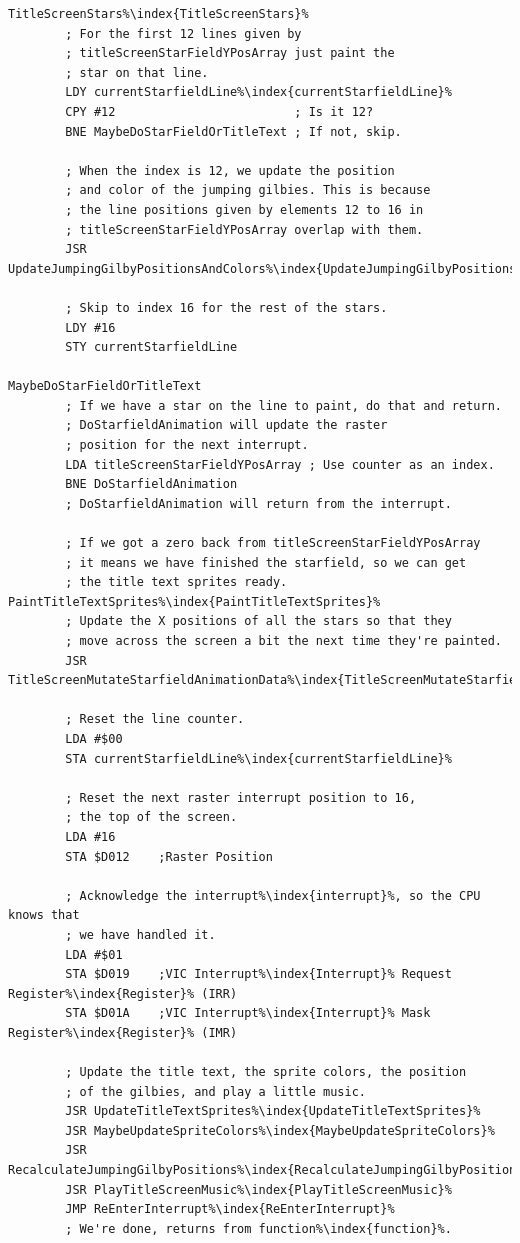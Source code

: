 \begin{lstlisting}[caption=\icode{TitleScreenStars\index{TitleScreenStars}} responsible for choosing what to do at each interrupt\index{interrupt}. ,escapechar=\%]
TitleScreenStars%\index{TitleScreenStars}%
        ; For the first 12 lines given by 
        ; titleScreenStarFieldYPosArray just paint the
        ; star on that line.
        LDY currentStarfieldLine%\index{currentStarfieldLine}%
        CPY #12                         ; Is it 12?
        BNE MaybeDoStarFieldOrTitleText ; If not, skip.

        ; When the index is 12, we update the position
        ; and color of the jumping gilbies. This is because
        ; the line positions given by elements 12 to 16 in
        ; titleScreenStarFieldYPosArray overlap with them.
        JSR UpdateJumpingGilbyPositionsAndColors%\index{UpdateJumpingGilbyPositionsAndColors}%

        ; Skip to index 16 for the rest of the stars.
        LDY #16
        STY currentStarfieldLine

MaybeDoStarFieldOrTitleText
        ; If we have a star on the line to paint, do that and return.
        ; DoStarfieldAnimation will update the raster
        ; position for the next interrupt.
        LDA titleScreenStarFieldYPosArray ; Use counter as an index.
        BNE DoStarfieldAnimation
        ; DoStarfieldAnimation will return from the interrupt.

        ; If we got a zero back from titleScreenStarFieldYPosArray
        ; it means we have finished the starfield, so we can get
        ; the title text sprites ready.
PaintTitleTextSprites%\index{PaintTitleTextSprites}%
        ; Update the X positions of all the stars so that they
        ; move across the screen a bit the next time they're painted.
        JSR TitleScreenMutateStarfieldAnimationData%\index{TitleScreenMutateStarfieldAnimationData}%

        ; Reset the line counter.
        LDA #$00
        STA currentStarfieldLine%\index{currentStarfieldLine}%

        ; Reset the next raster interrupt position to 16,
        ; the top of the screen.
        LDA #16
        STA $D012    ;Raster Position

        ; Acknowledge the interrupt%\index{interrupt}%, so the CPU knows that
        ; we have handled it.
        LDA #$01
        STA $D019    ;VIC Interrupt%\index{Interrupt}% Request Register%\index{Register}% (IRR)
        STA $D01A    ;VIC Interrupt%\index{Interrupt}% Mask Register%\index{Register}% (IMR)

        ; Update the title text, the sprite colors, the position 
        ; of the gilbies, and play a little music.
        JSR UpdateTitleTextSprites%\index{UpdateTitleTextSprites}%
        JSR MaybeUpdateSpriteColors%\index{MaybeUpdateSpriteColors}%
        JSR RecalculateJumpingGilbyPositions%\index{RecalculateJumpingGilbyPositions}%
        JSR PlayTitleScreenMusic%\index{PlayTitleScreenMusic}%
        JMP ReEnterInterrupt%\index{ReEnterInterrupt}%
        ; We're done, returns from function%\index{function}%.
\end{lstlisting}

